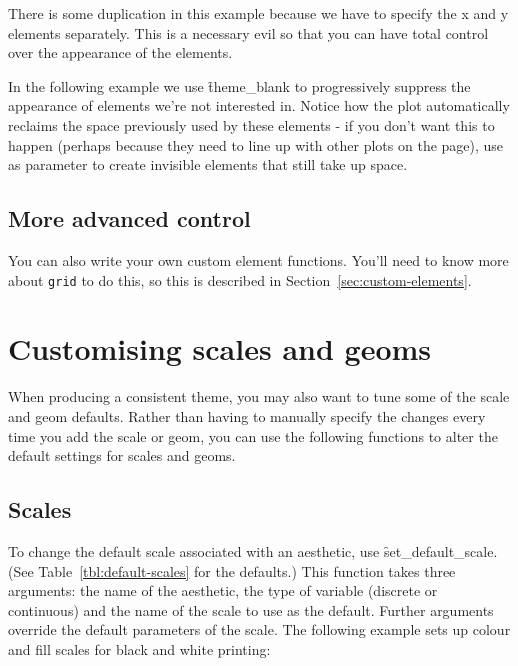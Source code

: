 There is some duplication in this example because we have to specify the x and y elements separately.  This is a necessary evil so that you can have total control over the appearance of the elements.

In the following example we use \f{theme_blank} to progressively suppress the appearance of elements we're not interested in.   Notice how the plot automatically reclaims the space previously used by these elements - if you don't want this to happen (perhaps because they need to line up with other plots on the page), use  as parameter to create invisible elements that still take up space.

% 


\subsection{More advanced control}
\label{sub:more_advanced_control}

You can also write your own custom element functions.  You'll need to know more about {\tt grid} to do this, so this is described in Section~\ref{sec:custom-elements}.

\section{Customising scales and geoms}
\label{sec:theme-scale-geom}

When producing a consistent theme, you may also want to tune some of the scale and geom defaults.  Rather than having to manually specify the changes every time you add the scale or geom, you can use the following functions to alter the default settings for scales and geoms.

\subsection{Scales}
\label{sub:customise-scales}

To change the default scale associated with an aesthetic, use \f{set_default_scale}. (See Table~\ref{tbl:default-scales} for the defaults.)  This function takes three arguments: the name of the aesthetic, the type of variable (discrete or continuous) and the name of the scale to use as the default.  Further arguments override the default parameters of the scale.  The following example sets up colour and fill scales for black and white printing:

